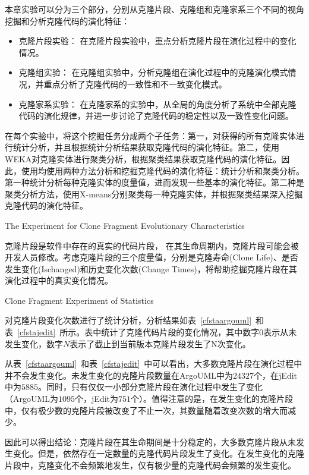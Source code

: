 本章实验可以分为三个部分，分别从克隆片段、克隆组和克隆家系三个不同的视角挖掘和分析克隆代码的演化特征：
\begin{itemize}
\item 克隆片段实验：
在克隆片段实验中，重点分析克隆片段在演化过程中的变化情况。 
\item 克隆组实验：
在克隆组实验中，分析克隆组在演化过程中的克隆演化模式情况，并重点分析了克隆代码的一致性和不一致变化模式。
\item 克隆家系实验：
在克隆家系的实验中，从全局的角度分析了系统中全部克隆代码的演化规律，并进一步讨论了克隆代码的稳定性以及一致性变化问题。
\end{itemize}

在每个实验中，将这个挖掘任务分成两个子任务：第一，对获得的所有克隆实体进行统计分析，并且根据统计分析结果获取克隆代码的演化特征。第二，使用WEKA对克隆实体进行聚类分析，根据聚类结果获取克隆代码的演化特征。因此，使用均使用两种方法分析和挖掘克隆代码的演化特征：统计分析和聚类分析。第一种统计分析每种克隆实体的度量值，进而发现一些基本的演化特征。第二种是聚类分析方法，使用{X-means}分别聚类每一种克隆实体，并根据聚类结果深入挖掘克隆代码的演化特征。

{The Experiment for Clone Fragment Evolutionary Characteristics}

克隆片段是软件中存在的真实的代码片段， 在其生命周期内，克隆片段可能会被开发人员修改。考虑克隆片段的三个度量值，分别是克隆寿命(Clone Life)、是否发生变化(Ischanged)和历史变化次数(Change Times)，将帮助挖掘克隆片段在其演化过程中的真实变化情况。

{Clone Fragment Experiment of Statistics}

对克隆片段变化次数进行了统计分析，分析结果如表~\ref{cfstaargouml}~和表~\ref{cfstajedit}~所示。表中统计了克隆代码片段的变化情况，其中数字$0$表示从未发生变化，数字$N$表示了截止到当前版本克隆片段发生了N次变化。

从表~\ref{cfstaargouml}~和表~\ref{cfstajedit}~中可以看出，大多数克隆片段在演化过程中并不会发生变化。未发生变化的克隆片段数量在ArgoUML中为$24327$个，在jEdit中为$5885$。同时，只有仅仅一小部分克隆片段在演化过程中发生了变化（ArgoUML为$1095$个，jEdit为$751$个）。值得注意的是，在发生变化的克隆片段中，仅有极少数的克隆片段被改变了不止一次，其数量随着改变次数的增大而减少。

 因此可以得出结论：克隆片段在其生命期间是十分稳定的，大多数克隆片段从未发生变化。但是，依然存在一定数量的克隆代码片段发生了变化。在发生变化的克隆片段中，克隆变化不会频繁地发生，仅有极少量的克隆代码会频繁的发生变化。

